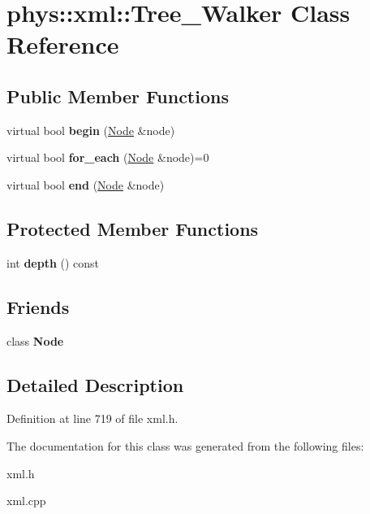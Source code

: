 \hypertarget{classphys_1_1xml_1_1Tree__Walker}{
\section{phys::xml::Tree\_\-Walker Class Reference}
\label{de/d03/classphys_1_1xml_1_1Tree__Walker}
}
\subsection*{Public Member Functions}
\begin{DoxyCompactItemize}
\item 
\hypertarget{classphys_1_1xml_1_1Tree__Walker_a37b0aa8907c0eaa3c43cf66431eb3496}{
virtual bool {\bfseries begin} (\hyperlink{classphys_1_1xml_1_1Node}{Node} \&node)}
\label{de/d03/classphys_1_1xml_1_1Tree__Walker_a37b0aa8907c0eaa3c43cf66431eb3496}

\item 
\hypertarget{classphys_1_1xml_1_1Tree__Walker_aa656fb8382127713f47f5aa9583bc302}{
virtual bool {\bfseries for\_\-each} (\hyperlink{classphys_1_1xml_1_1Node}{Node} \&node)=0}
\label{de/d03/classphys_1_1xml_1_1Tree__Walker_aa656fb8382127713f47f5aa9583bc302}

\item 
\hypertarget{classphys_1_1xml_1_1Tree__Walker_a2dbef3f3a1b4bd763c0dbdb54098c12d}{
virtual bool {\bfseries end} (\hyperlink{classphys_1_1xml_1_1Node}{Node} \&node)}
\label{de/d03/classphys_1_1xml_1_1Tree__Walker_a2dbef3f3a1b4bd763c0dbdb54098c12d}

\end{DoxyCompactItemize}
\subsection*{Protected Member Functions}
\begin{DoxyCompactItemize}
\item 
\hypertarget{classphys_1_1xml_1_1Tree__Walker_aa810703ee1f63117473d80842395872a}{
int {\bfseries depth} () const }
\label{de/d03/classphys_1_1xml_1_1Tree__Walker_aa810703ee1f63117473d80842395872a}

\end{DoxyCompactItemize}
\subsection*{Friends}
\begin{DoxyCompactItemize}
\item 
\hypertarget{classphys_1_1xml_1_1Tree__Walker_a6db9d28bd448a131448276ee03de1e6d}{
class {\bfseries Node}}
\label{de/d03/classphys_1_1xml_1_1Tree__Walker_a6db9d28bd448a131448276ee03de1e6d}

\end{DoxyCompactItemize}


\subsection{Detailed Description}


Definition at line 719 of file xml.h.



The documentation for this class was generated from the following files:\begin{DoxyCompactItemize}
\item 
xml.h\item 
xml.cpp\end{DoxyCompactItemize}
